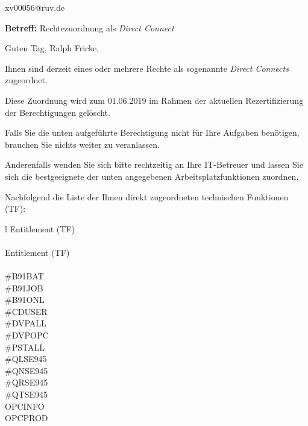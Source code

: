 \documentclass[a4paper,landscape,12pt]{letter}
\begin{document}
\begin{letter}{xv00056@ruv.de\hfill \break}
\begin{normalsize}
	\opening{\textbf{Betreff:} Rechtezuordnung als \emph{Direct Connect}}
	\begin{normalsize} \hfill
	\end{normalsize}

	\begin{normalsize}
		Guten Tag, 
	Ralph Fricke, \hfill \break
	\end{normalsize}
	\end{normalsize}
	
\begin{normalsize}
	Ihnen sind derzeit eines oder mehrere Rechte als sogenannte \emph{Direct Connects} zugeordnet.
	
	Diese Zuordnung wird zum 01.06.2019 im Rahmen der aktuellen Rezertifizierung der Berechtigungen gelöscht.
	
	Falls Sie die unten aufgeführte Berechtigung nicht für Ihre Aufgaben benötigen, 
	brauchen Sie nichts weiter zu veranlassen.
	
	Anderenfalls wenden Sie sich bitte rechtzeitig an Ihre IT-Betreuer 
	und lassen Sie sich die bestgeeignete der unten angegebenen Arbeitsplatzfunktionen zuordnen.
	\end{normalsize}
	
\begin{normalsize}
	Nachfolgend die Liste der Ihnen direkt zugeordneten technischen Funktionen (TF):

	\begin{longtable}{l}
		Entitlement (TF) \\ \hline
		\endfirsthead
		\\\hline
		Entitlement (TF) \\ \hline
		\endhead %
		\multicolumn{1}{r@{}}{Fortsetzung \ldots}\\
		\endfoot
		\hline
		\endlastfoot
	\#B91BAT\\\#B91JOB\\\#B91ONL\\\#CDUSER\\\#DVPALL\\\#DVPOPC\\\#PSTALL\\\#QLSE945\\\#QNSE945\\\#QRSE945\\\#QTSE945\\OPCINFO\\OPCPROD\\
	\end{longtable}
	\end{normalsize}
	

\end{letter}
\end{document}
